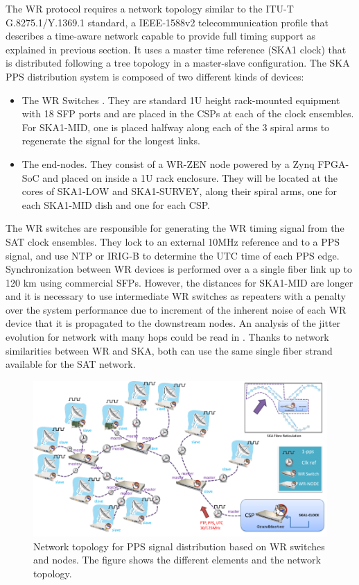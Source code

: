 The WR protocol requires a network topology similar to the ITU-T G.8275.1/Y.1369.1 standard, a IEEE-1588v2 telecommunication profile that describes a time-aware network capable to provide full timing support \cite{itu:TG8275_1_Y_1369_1} as explained in previous section. It uses a master time reference (SKA1 clock) that is distributed following a tree topology in a master-slave configuration. The SKA PPS distribution system is composed of two different kinds of devices: 

\begin{itemize}
	\item {The WR Switches \cite{sevensols:wr_switch}. They are standard 1U height rack-mounted equipment with 18 SFP ports and are placed in the CSPs at each of the clock ensembles. For SKA1-MID, one is placed halfway along each of the 3 spiral arms to regenerate the signal for the longest links.}
	\item{The end-nodes. They consist of a WR-ZEN node \cite{sevensols:wr_zen} powered by a Zynq FPGA-SoC and placed on inside a 1U rack enclosure. They will be located at the cores of SKA1-LOW and SKA1-SURVEY, along their spiral arms, one for each SKA1-MID dish and one for each CSP.}
\end{itemize}

The WR switches are responsible for generating the WR timing signal from the SAT clock ensembles. They lock to an external 10MHz reference and to a PPS signal, and use NTP or IRIG-B to determine the UTC time of each PPS edge. Synchronization between WR devices is performed over a a single fiber link up to 120 km using commercial SFPs.
However, the distances for SKA1-MID are longer and it is necessary to use 
intermediate WR switches as repeaters with a penalty over the system 
performance due to increment of the inherent noise of each WR device that it is 
propagated to the downstream nodes. An analysis of the jitter evolution for 
network with many hops could be read in \cite{torres2016scalability}. Thanks to 
network similarities between WR and SKA, both can use the same single fiber 
strand available for the SAT network. 

\begin{figure}[H]
	\centering
	\includegraphics[scale=0.4]{img/ska_pps_network}
	\caption{Network topology for PPS signal distribution based on WR switches and nodes. The figure shows the different elements and the network topology. }
	\label{fig:ska_pps_dist_network}
\end{figure}

